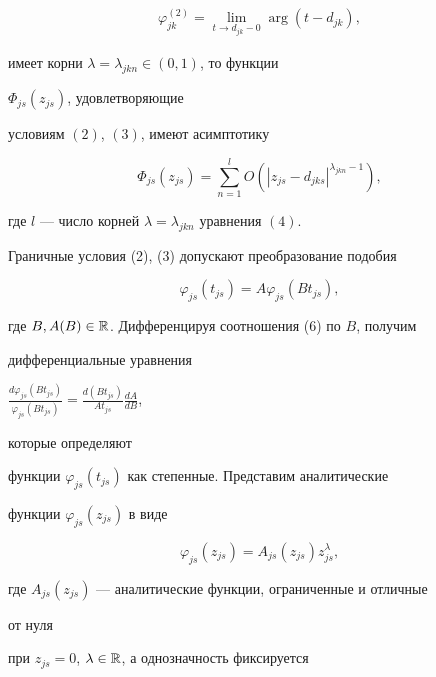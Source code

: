 {\begin{gather*}
\varphi^{(2)}_{jk}=\lim_{t\to d_{jk}-0} 


\arg(t-d_{jk}), 


\end{gather*} 


имеет корни $\lambda=\lambda_{jkn}\in(0,1)$, то функции 


$\Phi_{js}(z_{js})$, удовлетворяющие 


условиям $(2)$, $(3)$, имеют асимптотику 


\begin{equation} 


\Phi_{js}(z_{js})=\sum^l_{n=1}O 


(|z_{js}-d_{jks}|^{\lambda_{jkn}-1}), 


\end{equation} 


где $l$ --- число корней $\lambda=\lambda_{jkn}$ уравнения $(4)$. 


} 


 


Граничные условия (2), (3) допускают преобразование подобия 


\begin{equation} 


\varphi_{js}(t_{js})=A\varphi_{js}(B t_{js}), 


\end{equation} 


где $B,A(B)\in\Bbb R$. Дифференцируя соотношения (6) по $B$, получим 


дифференциальные уравнения 


$\frac{d\varphi_{js}(B t_{js})}{\varphi_{js}(B t_{js})}= 


\frac{d(B t_{js})}{A t_{js}}\frac{d A}{d B}$, 


которые определяют 


функции $\varphi_{js}(t_{js})$ как степенные. Представим аналитические 


функции $\varphi_{js}(z_{js})$ в виде 


\begin{equation} 


\varphi_{js}(z_{js})=A_{js}(z_{js})z^\lambda_{js}, 


\end{equation} 


где $A_{js}(z_{js})$ --- аналитические функции, ограниченные и отличные 


от нуля 


при $z_{js}=0$, $\lambda\in\Bbb R$, а однозначность фиксируется 


